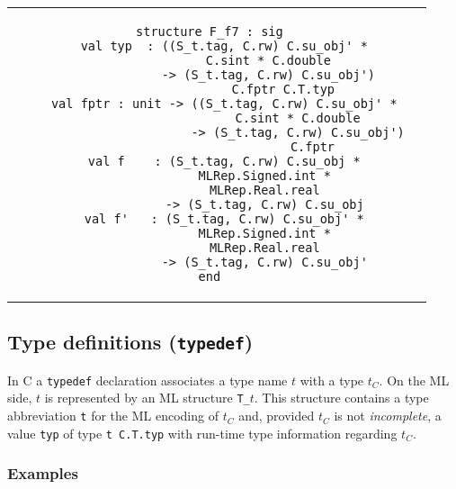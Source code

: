 \documentclass[titlepage,letterpaper]{article}
\begin{document}
\begin{small}
\begin{center}
\begin{tabular}{c|c}
\begin{minipage}{4in}
\begin{verbatim}
structure F_f7 : sig
    val typ  : ((S_t.tag, C.rw) C.su_obj' *
                C.sint * C.double
                -> (S_t.tag, C.rw) C.su_obj')
                    C.fptr C.T.typ
    val fptr : unit -> ((S_t.tag, C.rw) C.su_obj' *
                        C.sint * C.double
                        -> (S_t.tag, C.rw) C.su_obj')
                            C.fptr
    val f    : (S_t.tag, C.rw) C.su_obj *
               MLRep.Signed.int *
               MLRep.Real.real
               -> (S_t.tag, C.rw) C.su_obj
    val f'   : (S_t.tag, C.rw) C.su_obj' *
               MLRep.Signed.int *
               MLRep.Real.real
               -> (S_t.tag, C.rw) C.su_obj'
end

\end{verbatim}
\end{minipage}
\end{tabular}
\end{center}
\end{small}

\subsection{Type definitions ({\tt typedef})}

In C a {\tt typedef} declaration associates a type name $t$ with a
type $t_C$.  On the ML side, $t$ is represented by an ML structure
{\tt T\_$t$}.  This structure contains a type abbreviation {\tt t} for
the ML encoding of $t_C$ and, provided $t_C$ is not {\em incomplete},
a value {\tt typ} of type {\tt t C.T.typ} with run-time type
information regarding $t_C$.

\subsubsection*{Examples}
\end{document}
